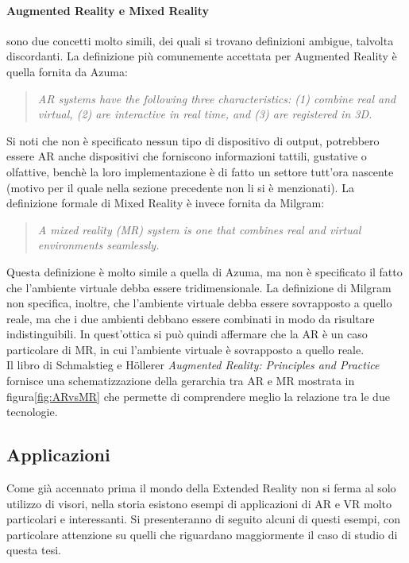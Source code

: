         \paragraph{Augmented Reality e Mixed Reality} sono due concetti molto simili, dei quali si trovano
            definizioni ambigue, talvolta discordanti. La definizione più comunemente accettata per Augmented 
            Reality è quella fornita da Azuma\cite{Azuma1997}:
            \begin{quote}
                \textit{AR systems have the following three characteristics: (1) combine real and virtual, 
                (2) are interactive in real time, and (3) are registered in 3D.}
            \end{quote}
            Si noti che non è specificato nessun tipo di dispositivo di output, potrebbero essere 
            AR anche dispositivi che forniscono informazioni tattili, gustative o olfattive, benchè
            la loro implementazione è di fatto un settore tutt'ora nascente (motivo per il quale nella sezione
            precedente non li si è menzionati). La definizione formale di Mixed Reality è invece 
            fornita da Milgram\cite{Milgram1994}:
            \begin{quote}
                \textit{A mixed reality (MR) system is one that combines real and virtual environments 
                seamlessly.}
            \end{quote}
            Questa definizione è molto simile a quella di Azuma, ma non è specificato il fatto che
            l'ambiente virtuale debba essere tridimensionale. La definizione di Milgram
            non specifica, inoltre, che l'ambiente virtuale debba essere sovrapposto a quello reale, ma che
            i due ambienti debbano essere combinati in modo da risultare indistinguibili. In quest'ottica 
            si può quindi affermare che la AR è un caso particolare di MR, in cui l'ambiente virtuale è
            sovrapposto a quello reale. \\
            Il libro di Schmalstieg e Höllerer \textit{Augmented Reality: Principles and Practice}\cite{Schmalstieg2016} 
            fornisce una schematizzazione della gerarchia tra AR e MR mostrata in figura\ref{fig:ARvsMR}
            che permette di comprendere meglio la relazione tra le due tecnologie. 
            
    \subsection{Applicazioni}\label{subsec:XRTipologie}
        Come già accennato prima il mondo della Extended Reality non si ferma al solo utilizzo di visori,
        nella storia esistono esempi di applicazioni di AR e VR molto particolari e interessanti. Si presenteranno
        di seguito alcuni di questi esempi, con particolare attenzione su quelli che riguardano maggiormente
        il caso di studio di questa tesi.
